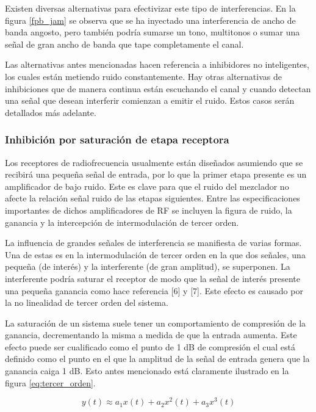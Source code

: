 Existen diversas alternativas para efectivizar este tipo de interferencias. En la figura \ref{fpb_jam} se observa que se ha inyectado una
interferencia de ancho de banda angosto, pero también podría sumarse un tono, multitonos o sumar una señal de gran ancho de banda que 
tape completamente el canal. \par
Las alternativas antes mencionadas hacen referencia a inhibidores no inteligentes, los cuales están metiendo ruido constantemente. Hay otras 
alternativas de inhibiciones que de manera continua están escuchando el canal y cuando detectan una señal que 
desean interferir comienzan a emitir el ruido. Estos casos serán detallados más adelante.

\subsubsection{Inhibición por saturación de etapa receptora}

Los receptores de radiofrecuencia usualmente están diseñados asumiendo que se recibirá una pequeña señal de entrada, por lo que la primer
etapa presente es un amplificador de bajo ruido.  Este es clave para que el ruido del mezclador no afecte la relación señal ruido de las 
etapas siguientes. Entre las especificaciones importantes de dichos amplificadores de RF se incluyen la figura de ruido, la ganancia y la 
intercepción de intermodulación de tercer orden.\par
La influencia de grandes señales de interferencia se manifiesta de varias formas. Una de estas es en la intermodulación de tercer orden en la que dos señales, una pequeña (de interés) y la interferente (de gran amplitud), se superponen. La interferente podría saturar el receptor de modo que la señal de interés presente una pequeña ganancia como hace referencia [6] y [7]. Este efecto es causado por la no linealidad de tercer orden del sistema.

La saturación de un sistema suele tener un comportamiento de compresión  de la ganancia, decrementando la misma a medida de que la entrada aumenta.
Este efecto puede ser cualificado como el punto de 1 dB de compresión el cual está definido como el punto en el que la amplitud de la señal de 
entrada genera que la ganancia caiga 1 dB. Esto antes mencionado está claramente ilustrado en la figura \ref{eq:tercer_orden}.

\begin{equation}\label{eq:tercer_orden}
    y(t) \approx  a_1 x(t) + a_2 x^{2}(t) + a_3 x^{3}(t) 
\end{equation}

